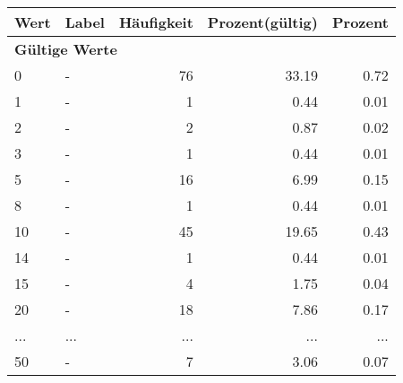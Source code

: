      \begin{longtable}{lXrrr}
     \toprule
     \textbf{Wert} & \textbf{Label} & \textbf{Häufigkeit} & \textbf{Prozent(gültig)} & \textbf{Prozent} \\
     \endhead
     \midrule
     \multicolumn{5}{l}{\textbf{Gültige Werte}}\\
        0 & \multicolumn{1}{X}{-} & %
          \num{76} &
          \num[round-mode=places,round-precision=2]{33,19} &
          \num[round-mode=places,round-precision=2]{0,72} \\
        1 & \multicolumn{1}{X}{-} & %
          \num{1} &
          \num[round-mode=places,round-precision=2]{0,44} &
          \num[round-mode=places,round-precision=2]{0,01} \\
        2 & \multicolumn{1}{X}{-} & %
          \num{2} &
          \num[round-mode=places,round-precision=2]{0,87} &
          \num[round-mode=places,round-precision=2]{0,02} \\
        3 & \multicolumn{1}{X}{-} & %
          \num{1} &
          \num[round-mode=places,round-precision=2]{0,44} &
          \num[round-mode=places,round-precision=2]{0,01} \\
        5 & \multicolumn{1}{X}{-} & %
          \num{16} &
          \num[round-mode=places,round-precision=2]{6,99} &
          \num[round-mode=places,round-precision=2]{0,15} \\
        8 & \multicolumn{1}{X}{-} & %
          \num{1} &
          \num[round-mode=places,round-precision=2]{0,44} &
          \num[round-mode=places,round-precision=2]{0,01} \\
        10 & \multicolumn{1}{X}{-} & %
          \num{45} &
          \num[round-mode=places,round-precision=2]{19,65} &
          \num[round-mode=places,round-precision=2]{0,43} \\
        14 & \multicolumn{1}{X}{-} & %
          \num{1} &
          \num[round-mode=places,round-precision=2]{0,44} &
          \num[round-mode=places,round-precision=2]{0,01} \\
        15 & \multicolumn{1}{X}{-} & %
          \num{4} &
          \num[round-mode=places,round-precision=2]{1,75} &
          \num[round-mode=places,round-precision=2]{0,04} \\
        20 & \multicolumn{1}{X}{-} & %
          \num{18} &
          \num[round-mode=places,round-precision=2]{7,86} &
          \num[round-mode=places,round-precision=2]{0,17} \\
       ... & ... & ... & ... & ... \\
        50 & \multicolumn{1}{X}{-} & %
          \num{7} &
          \num[round-mode=places,round-precision=2]{3,06} &
          \num[round-mode=places,round-precision=2]{0,07} \\


\end{longtable}
